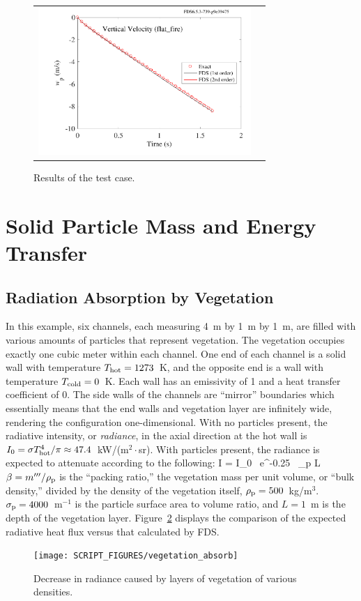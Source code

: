 \documentclass[11pt]{book}
\begin{document}
\begin{figure}[!ht]
\begin{tabular*}{\textwidth}{l@{\extracolsep{\fill}}r}
\includegraphics[height=2.2in]{SCRIPT_FIGURES/flat_fire_w} &
\end{tabular*}
\caption[Results of the  test case]{Results of the  test case.}
\label{flat_fire_plots}
\end{figure}



\clearpage

\section{Solid Particle Mass and Energy Transfer}

\subsection{Radiation Absorption by Vegetation}
\label{vegetation_absorb}

In this example, six channels, each measuring 4~m by 1~m by 1~m, are filled with various amounts of particles that represent vegetation. The vegetation occupies exactly one cubic meter within each channel. One end of each channel is a solid wall with temperature $T_{\rm hot}= 1273$~K, and the opposite end is a wall with temperature $T_{\rm cold}=0$~K. Each wall has an emissivity of 1 and a heat transfer coefficient of 0. The side walls of the channels are ``mirror'' boundaries which essentially means that the end walls and vegetation layer are infinitely wide, rendering the configuration one-dimensional. With no particles present, the radiative intensity, or {\em radiance}, in the axial direction at the hot wall is $I_0=\sigma T_{\rm hot}^4/\pi \approx 47.4$~kW/(m$^2 \cdot$sr). With particles present, the radiance is expected to attenuate according to the following:
\be
   I = I_0 \, \hbox{e}^{-0.25 \, \beta \sigma_{\rm p} L}
\ee
$\beta=m'''/\rho_{\rm p}$ is the ``packing ratio,'' the vegetation mass per unit volume, or ``bulk density,'' divided by the density of the vegetation itself, $\rho_{\rm p}=500$~kg/m$^3$. $\sigma_{\rm p}=4000$~m$^{-1}$ is the particle surface area to volume ratio, and $L=1$~m is the depth of the vegetation layer. Figure~\ref{vegetation_absorb_fig} displays the comparison of the expected radiative heat flux versus that calculated by FDS.
\begin{figure}[!ht]
\centering
\texttt{[image: SCRIPT\_FIGURES/vegetation\_absorb]}
\caption[Results of the  test case]{Decrease in radiance caused by layers of vegetation of various densities.}
\label{vegetation_absorb_fig}
\end{figure}
\end{document}
